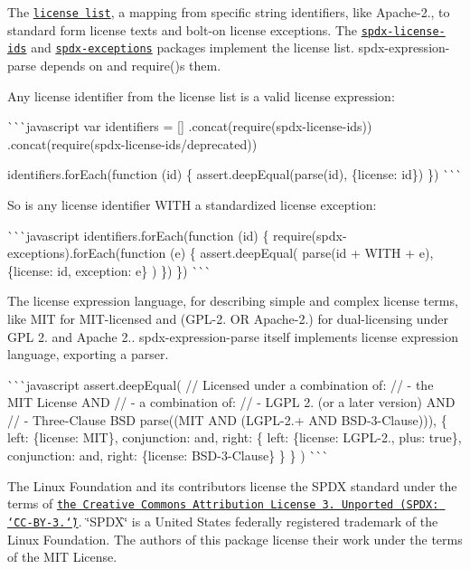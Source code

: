\begin{DoxyEnumerate}
\item The \href{https://spdx.org/licenses}{\tt license list}, a mapping from specific string identifiers, like {\ttfamily Apache-\/2.}, to standard form license texts and bolt-\/on license exceptions. The \href{https://www.npmjs.com/package/spdx-exceptions}{\tt spdx-\/license-\/ids} and \href{https://www.npmjs.com/package/spdx-license-ids}{\tt spdx-\/exceptions} packages implement the license list. {\ttfamily spdx-\/expression-\/parse} depends on and {\ttfamily require()}s them.

Any license identifier from the license list is a valid license expression\+:

\`{}\`{}\`{}javascript var identifiers = \mbox{[}\mbox{]} .concat(require(\textquotesingle{}spdx-\/license-\/ids\textquotesingle{})) .concat(require(\textquotesingle{}spdx-\/license-\/ids/deprecated\textquotesingle{}))

identifiers.\+for\+Each(function (id) \{ assert.\+deep\+Equal(parse(id), \{license\+: id\}) \}) \`{}\`{}\`{}

So is any license identifier {\ttfamily W\+I\+TH} a standardized license exception\+:

\`{}\`{}\`{}javascript identifiers.\+for\+Each(function (id) \{ require(\textquotesingle{}spdx-\/exceptions\textquotesingle{}).for\+Each(function (e) \{ assert.\+deep\+Equal( parse(id + \textquotesingle{} W\+I\+TH \textquotesingle{} + e), \{license\+: id, exception\+: e\} ) \}) \}) \`{}\`{}\`{}
\item The license expression language, for describing simple and complex license terms, like {\ttfamily M\+IT} for M\+I\+T-\/licensed and {\ttfamily (G\+P\+L-\/2. OR Apache-\/2.)} for dual-\/licensing under G\+PL 2. and Apache 2.. {\ttfamily spdx-\/expression-\/parse} itself implements license expression language, exporting a parser.

\`{}\`{}\`{}javascript assert.\+deep\+Equal( // Licensed under a combination of\+: // -\/ the M\+IT License A\+ND // -\/ a combination of\+: // -\/ L\+G\+PL 2. (or a later version) A\+ND // -\/ Three-\/\+Clause B\+SD parse(\textquotesingle{}(M\+IT A\+ND (L\+G\+P\+L-\/2.+ A\+ND B\+S\+D-\/3-\/\+Clause))\textquotesingle{}), \{ left\+: \{license\+: \textquotesingle{}M\+IT\textquotesingle{}\}, conjunction\+: \textquotesingle{}and\textquotesingle{}, right\+: \{ left\+: \{license\+: \textquotesingle{}L\+G\+P\+L-\/2.\textquotesingle{}, plus\+: true\}, conjunction\+: \textquotesingle{}and\textquotesingle{}, right\+: \{license\+: \textquotesingle{}B\+S\+D-\/3-\/\+Clause\textquotesingle{}\} \} \} ) \`{}\`{}\`{}
\end{DoxyEnumerate}

The Linux Foundation and its contributors license the S\+P\+DX standard under the terms of \href{http://spdx.org/licenses/CC-BY-3.0}{\tt the Creative Commons Attribution License 3. Unported (S\+P\+D\+X\+: \char`\"{}\+C\+C-\/\+B\+Y-\/3.\char`\"{})}. \char`\"{}\+S\+P\+D\+X\char`\"{} is a United States federally registered trademark of the Linux Foundation. The authors of this package license their work under the terms of the M\+IT License. 